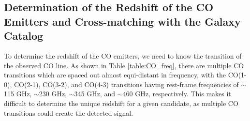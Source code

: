 
\subsection{Determination of the Redshift of the CO Emitters and Cross-matching with the Galaxy Catalog}

To determine the redshift of the CO emitters, we need to know the transition of the observed CO line. As shown in Table \ref{table:CO_freq}, there are multiple CO transitions which are spaced out almost equi-distant in frequency, with the CO(1-0), CO(2-1), CO(3-2), and CO(4-3) transitions having rest-frame frequencies of $\sim$115 GHz, $\sim$230 GHz, $\sim$345 GHz, and $\sim$460 GHz, respectively. This makes it difficult to determine the unique redshift for a given candidate, as multiple CO transitions could create the detected signal.


